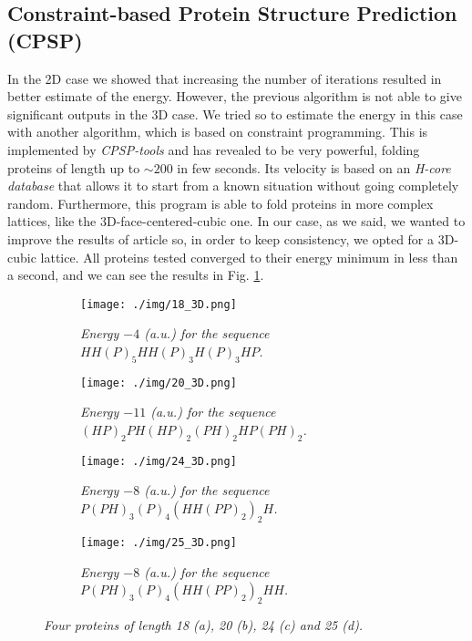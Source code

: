 \subsection{Constraint-based Protein Structure Prediction (CPSP)}
In the 2D case we showed that increasing the number of iterations resulted in better estimate of the energy.
However, the previous algorithm is not able to give significant outputs in the 3D case.
We tried so to estimate the energy in this case with another algorithm, which is based on constraint programming.
This is implemented by \emph{CPSP-tools} \cite{cpsp} and has revealed to be very powerful, folding proteins of length up to $\sim 200$ in few seconds.
Its velocity is based on an \emph{H-core database} that allows it to start from a known situation without going completely random.
Furthermore, this program is able to fold proteins in more complex lattices, like the 3D-face-centered-cubic one.
In our case, as we said, we wanted to improve the results of article \cite{PERM} so, in order to keep consistency, we opted for a 3D-cubic lattice.
All proteins tested converged to their energy minimum in less than a second, and we can see the results in Fig. \ref{fig:cpsp}.

\begin{figure}[H]
    \centering
    \begin{subfigure}[b]{0.45\textwidth}
        \centering
        \texttt{[image: ./img/18\_3D.png]}
        \caption{\emph{Energy $-4$ (a.u.) for the sequence $HH(P)_5HH(P)_3H(P)_3HP$.}}
    \end{subfigure}
    \begin{subfigure}[b]{0.45\textwidth}
        \centering
        \texttt{[image: ./img/20\_3D.png]}
        \caption{\emph{Energy $-11$ (a.u.) for the sequence $(HP)_2PH(HP)_2(PH)_2HP(PH)_2$.}}
    \end{subfigure}
    \begin{subfigure}[b]{0.45\textwidth}
        \centering
        \texttt{[image: ./img/24\_3D.png]}
        \caption{\emph{Energy $-8$ (a.u.) for the sequence $P(PH)_3(P)_4(HH(PP)_2)_2H$.}}
    \end{subfigure}
    \begin{subfigure}[b]{0.45\textwidth}
        \centering
        \texttt{[image: ./img/25\_3D.png]}
        \caption{\emph{Energy $-8$ (a.u.) for the sequence $P(PH)_3(P)_4(HH(PP)_2)_2HH$.}}
    \end{subfigure}

    \caption{\emph{Four proteins of length 18 (a), 20 (b), 24 (c) and 25 (d).}}
    \label{fig:cpsp}
\end{figure}


